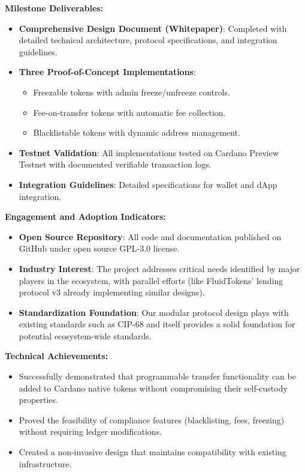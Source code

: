 \noindent{}\textbf{Milestone Deliverables:}
\begin{itemize}
\item \checkmark{} \textbf{Comprehensive Design Document (Whitepaper)}: Completed with detailed technical architecture, protocol specifications, and integration guidelines.
\item \checkmark{} \textbf{Three Proof-of-Concept Implementations}: 
  \begin{itemize}
  \item Freezable tokens with admin freeze/unfreeze controls.
  \item Fee-on-transfer tokens with automatic fee collection.
  \item Blacklistable tokens with dynamic address management.
  \end{itemize}
\item \checkmark{} \textbf{Testnet Validation}: All implementations tested on Cardano Preview Testnet with documented verifiable transaction logs.
\item \checkmark{} \textbf{Integration Guidelines}: Detailed specifications for wallet and dApp integration.
\end{itemize}

\medskip{}

\noindent{}\textbf{Engagement and Adoption Indicators:}
\begin{itemize}
\item \textbf{Open Source Repository}: All code and documentation published on GitHub under open source GPL-3.0 license.
\item \textbf{Industry Interest}: The project addresses critical needs identified by major players in the ecosystem, with parallel efforts (like FluidTokens' lending protocol v3 already implementing similar designs).
\item \textbf{Standardization Foundation}: Our modular protocol design plays with existing standards such as CIP-68 and itself provides a solid foundation for potential ecosystem-wide standards.
\end{itemize}

\medskip{}

\noindent{}\textbf{Technical Achievements:}
\begin{itemize}
\item Successfully demonstrated that programmable transfer functionality can be added to Cardano native tokens without compromising their self-custody properties.
\item Proved the feasibility of compliance features (blacklisting, fees, freezing) without requiring ledger modifications.
\item Created a non-invasive design that maintains compatibility with existing infrastructure.
\end{itemize}

